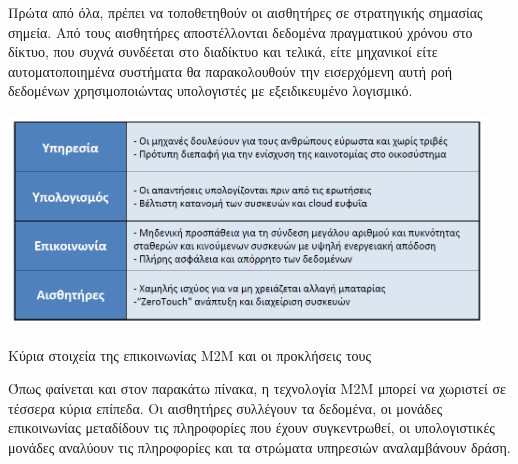 \documentclass[12pt, a4paper, oneside]{report}
\begin{document}
Πρώτα από όλα, πρέπει να τοποθετηθούν οι αισθητήρες σε στρατηγικής σημασίας σημεία. Από τους αισθητήρες αποστέλλονται δεδομένα πραγματικού χρόνου στο δίκτυο, που συχνά συνδέεται στο διαδίκτυο και τελικά, είτε μηχανικοί είτε αυτοματοποιημένα συστήματα θα παρακολουθούν την εισερχόμενη αυτή ροή δεδομένων χρησιμοποιώντας υπολογιστές με εξειδικευμένο λογισμικό.
\begin{table}[ht]
\centering
\includegraphics[width=0.95\textwidth]{eikona_04}
\caption[Στοιχεία επικοινωνίας M2M και προκλήσεις]{Κύρια στοιχεία της επικοινωνίας M2M και οι προκλήσεις τους\cite{zwtou}}
\end{table}

Όπως φαίνεται και στον παρακάτω πίνακα, η τεχνολογία Μ2Μ μπορεί να χωριστεί σε τέσσερα κύρια επίπεδα. Οι αισθητήρες συλλέγουν τα δεδομένα, οι μονάδες επικοινωνίας μεταδίδουν τις πληροφορίες που έχουν συγκεντρωθεί, οι υπολογιστικές μονάδες αναλύουν τις πληροφορίες και τα στρώματα υπηρεσιών αναλαμβάνουν δράση.
\end{document}
